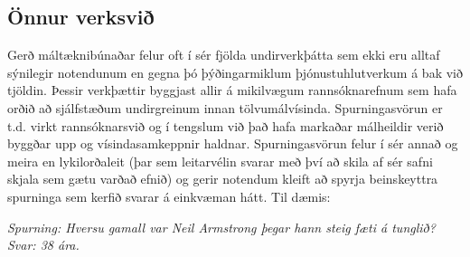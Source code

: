 \documentclass{../../metanetpaper}
\begin{document}
\begin{multicols}{2}
\subsection{Önnur verksvið}

Gerð máltæknibúnaðar felur oft í sér fjölda undirverkþátta sem ekki eru alltaf sýnilegir notendunum en gegna þó þýðingarmiklum þjónustuhlutverkum á bak við tjöldin. Þessir verkþættir byggjast allir á mikilvægum rannsóknarefnum sem hafa orðið að sjálfstæðum undirgreinum innan tölvumálvísinda.
Spurningasvörun er t.d. virkt rannsóknarsvið og í tengslum við það hafa markaðar málheildir verið byggðar upp og vísindasamkeppnir haldnar. Spurningasvörun felur í sér annað og meira en lykilorðaleit (þar sem leitarvélin svarar með því að skila af sér safni skjala sem gætu varðað efnið) og gerir notendum kleift að spyrja beinskeyttra spurninga sem kerfið svarar á einkvæman hátt. Til dæmis:

\textit{Spurning: Hversu gamall var Neil Armstrong þegar hann steig fæti á tunglið?}\\
\textit{Svar: 38 ára.}


\end{multicols}
\end{document}
